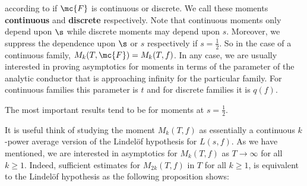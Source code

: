   according to if $\mc{F}$ is continuous or discrete. We call these moments \textbf{continuous} and \textbf{discrete} respectively. Note that continuous moments only depend upon $\s$ while discrete moments may depend upon $s$. Moreover, we suppress the dependence upon $\s$ or $s$ respectively if $s = \frac{1}{2}$. So in the case of a continuous family, $M_{k}(T,\mc{F}) = M_{k}(T,f)$. In any case, we are usually interested in proving asymptotics for moments in terms of the parameter of the analytic conductor that is approaching infinity for the particular family. For continuous families this parameter is $t$ and for discrete families it is $q(f)$.
  
  \begin{remark}
    The most important results tend to be for moments at $s = \frac{1}{2}$.
  \end{remark}

  It is useful think of studying the moment $M_{k}(T,f)$ as essentially a continuous $k$-power average version of the Lindel\"of hypothesis for $L(s,f)$. As we have mentioned, we are interested in asymptotics for $M_{k}(T,f)$ as $T \to \infty$ for all $k \ge 1$. Indeed, sufficient estimates for $M_{2k}(T,f)$ in $T$ for all $k \ge 1$, is equivalent to the Lindel\"of hypothesis as the following proposition shows:

